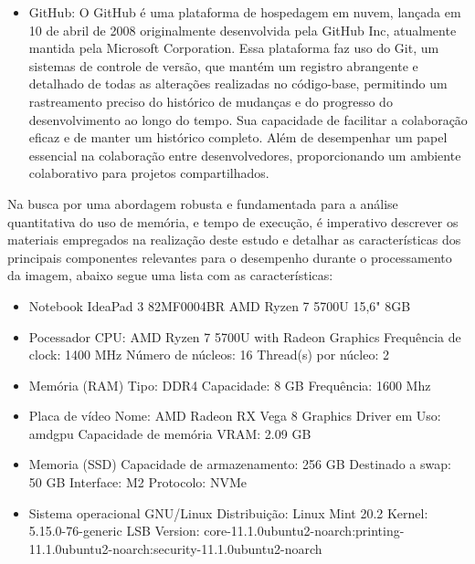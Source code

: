 \begin{itemize}
    \item GitHub: O GitHub é uma plataforma de hospedagem em nuvem, lançada em 10 de abril de 2008 originalmente desenvolvida pela GitHub Inc, atualmente mantida pela Microsoft Corporation. Essa plataforma faz uso do Git, um sistemas de controle de versão, que mantém um registro abrangente e detalhado de todas as alterações realizadas no código-base, permitindo um rastreamento preciso do histórico de mudanças e do progresso do desenvolvimento ao longo do tempo. Sua capacidade de facilitar a colaboração eficaz e de manter um histórico completo. Além de desempenhar um papel essencial na colaboração entre desenvolvedores, proporcionando um ambiente colaborativo para projetos compartilhados\cite{github}.

 \end{itemize}

Na busca por uma abordagem robusta e fundamentada para a análise quantitativa do uso de memória, e tempo de execução, é imperativo descrever os materiais empregados na realização deste estudo e detalhar as características dos principais componentes relevantes para o desempenho durante o processamento da imagem, abaixo segue uma lista com as características:

\begin{itemize}

\item Notebook IdeaPad 3 82MF0004BR AMD Ryzen 7 5700U 15,6" 8GB 

\item Pocessador
\subitem CPU: AMD Ryzen 7 5700U with Radeon Graphics
\subitem Frequência de clock: 1400 MHz
\subitem Número de núcleos: 16
\subitem Thread(s) por núcleo: 2

\item Memória (RAM)
\subitem Tipo: DDR4
\subitem Capacidade: 8 GB
\subitem Frequência: 1600 Mhz

\item Placa de vídeo
\subitem Nome: AMD Radeon RX Vega 8 Graphics
\subitem Driver em Uso: amdgpu
\subitem Capacidade de memória VRAM: 2.09 GB

\item Memoria (SSD)
\subitem Capacidade de armazenamento: 256 GB
\subitem Destinado a swap: 50 GB
\subitem Interface: M2
\subitem Protocolo: NVMe

\item Sistema operacional GNU/Linux
\subitem Distribuição: Linux Mint 20.2
\subitem Kernel: 5.15.0-76-generic
\subitem LSB Version: core-11.1.0ubuntu2-noarch:printing-11.1.0ubuntu2-noarch:security-11.1.0ubuntu2-noarch




\end{itemize}


